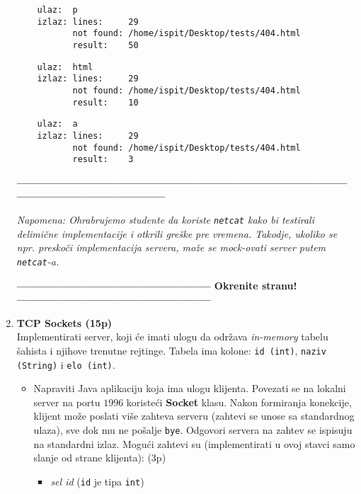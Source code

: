 \documentclass[]{article}
\begin{document}
\begin{enumerate}
  \noindent
  \begin{lstlisting}
    ulaz:  p
    izlaz: lines:     29
           not found: /home/ispit/Desktop/tests/404.html
           result:    50
  \end{lstlisting}
  \begin{lstlisting}
    ulaz:  html
    izlaz: lines:     29
           not found: /home/ispit/Desktop/tests/404.html
           result:    10
  \end{lstlisting}
  \begin{lstlisting}
    ulaz:  a
    izlaz: lines:     29
           not found: /home/ispit/Desktop/tests/404.html
           result:    3
  \end{lstlisting}
\vspace{15pt}
\begin{center}
  \textbf{------------------------------------------------------------------------------------------------------------------------------}
\end{center}
\textit{Napomena: Ohrabrujemo studente da koriste \texttt{netcat} kako bi testirali delimi\v{c}ne implementacije i otkrili gre\v{s}ke pre vremena. Takodje, ukoliko se npr. presko\v{c}i implementacija servera, mo\v{z}e se mock-ovati server putem \texttt{netcat}-a.} 
\begin{center}
  \textbf{--------------------------------------------------- Okrenite stranu! ---------------------------------------------------}
\end{center}
\newpage
\item \textbf{TCP Sockets (15p)}
\\Implementirati server, koji će imati ulogu da održava \emph{in-memory} tabelu šahista i njihove trenutne rejtinge. Tabela ima kolone: \texttt{id (int)}, \texttt{naziv (String)} i \texttt{elo (int)}.
\begin{itemize}
  \item Napraviti Java aplikaciju koja ima ulogu klijenta. Povezati se na lokalni server na portu $1996$ koristeći \textbf{Socket} klasu. Nakon formiranja konekcije, klijent mo\v{z}e poslati vi\v{s}e zahteva serveru (zahtevi se unose sa standardnog ulaza), sve dok mu ne pošalje \texttt{bye}. Odgovori servera na zahtev se ispisuju na standardni izlaz. Mogući zahtevi su (implementirati u ovoj stavci samo slanje od strane klijenta): \hfill (3p)
  \begin{itemize}
      \item \textit{sel id} (\texttt{id} je tipa \texttt{int})

\end{itemize}
\end{itemize}
\end{enumerate}
\end{document}
